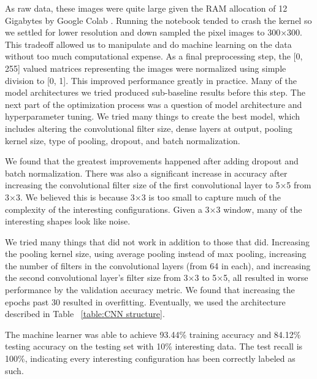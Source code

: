 \documentclass[12pt]{article}
\numberwithin{figure}{section} %
\begin{document}
As raw data, these images were quite large given the RAM allocation of 12 Gigabytes by Google Colab \cite{Google Colab}. Running the notebook tended to crash the kernel so we settled for lower resolution and down sampled the pixel images to 300×300. This tradeoff allowed us to manipulate and do machine learning on the data without too much computational expense. As a final preprocessing step, the [0, 255] valued matrices representing the images were normalized using simple division to [0, 1]. This improved performance greatly in practice. Many of the model architectures we tried produced sub-baseline results before this step. The next part of the optimization process was a question of model architecture and hyperparameter tuning. We tried many things to create the best model, which includes altering the convolutional filter size, dense layers at output, pooling kernel size, type of pooling, dropout, and batch normalization. 

We found that the greatest improvements happened after adding dropout and batch normalization. There was also a significant increase in accuracy after increasing the convolutional filter size of the first convolutional layer to 5×5 from 3×3. We believed this is because 3×3 is too small to capture much of the complexity of the interesting configurations. Given a 3×3 window, many of the interesting shapes look like noise.

We tried many things that did not work in addition to those that did. Increasing the pooling kernel size, using average pooling instead of max pooling, increasing the number of filters in the convolutional layers (from 64 in each), and increasing the second convolutional layer’s filter size from 3×3 to 5×5, all resulted in worse performance by the validation accuracy metric. We found that increasing the epochs past 30 resulted in overfitting. Eventually, we used the architecture described in Table ~\ref{table:CNN structure}.

The machine learner was able to achieve 93.44\% training accuracy and 84.12\% testing accuracy on the testing set with 10\% interesting data. The test recall is 100\%, indicating every interesting configuration has been correctly labeled as such. 
\end{document}
